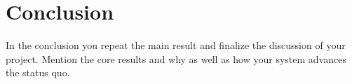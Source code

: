 \documentclass[a4paper,11pt,oneside]{report}
\begin{document}
\chapter{Conclusion}

In the conclusion you repeat the main result and finalize the discussion of
your project. Mention the core results and why as well as how your system
advances the status quo.

\cleardoublepage
{}
{}
\printbibliography

%
%
\end{document}
